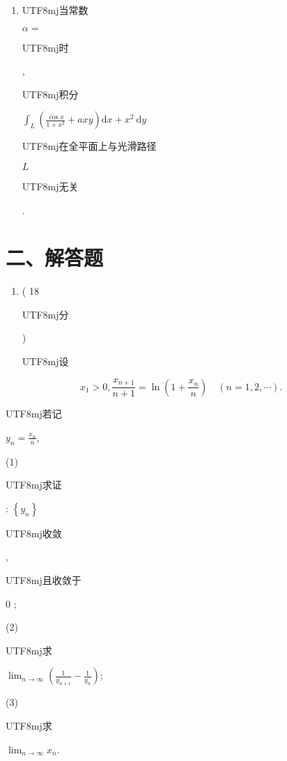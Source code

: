 \documentclass[10pt]{article}
\begin{document}
\begin{enumerate}
  \item \begin{CJK}{UTF8}{mj}当常数\end{CJK} $\alpha=$ \begin{CJK}{UTF8}{mj}时\end{CJK}, \begin{CJK}{UTF8}{mj}积分\end{CJK} $\int_{L}\left(\frac{\cos x}{1+x^{2}}+a x y\right) \mathrm{d} x+x^{2} \mathrm{~d} y$ \begin{CJK}{UTF8}{mj}在全平面上与光滑路径\end{CJK} $L$ \begin{CJK}{UTF8}{mj}无关\end{CJK}.

\end{enumerate}
\section{二、解答题}
\begin{enumerate}
  \item ( 18 \begin{CJK}{UTF8}{mj}分\end{CJK}) \begin{CJK}{UTF8}{mj}设\end{CJK}
\end{enumerate}
$$
x_{1}>0, \frac{x_{n+1}}{n+1}=\ln \left(1+\frac{x_{n}}{n}\right) \quad(n=1,2, \cdots) .
$$
\begin{CJK}{UTF8}{mj}若记\end{CJK} $y_{n}=\frac{x_{n}}{n}$,

(1) \begin{CJK}{UTF8}{mj}求证\end{CJK}: $\left\{y_{n}\right\}$ \begin{CJK}{UTF8}{mj}收敛\end{CJK}, \begin{CJK}{UTF8}{mj}且收敛于\end{CJK} 0 ;

(2) \begin{CJK}{UTF8}{mj}求\end{CJK} $\lim _{n \rightarrow \infty}\left(\frac{1}{y_{n+1}}-\frac{1}{y_{n}}\right)$;

(3) \begin{CJK}{UTF8}{mj}求\end{CJK} $\lim _{n \rightarrow \infty} x_{n}$.
\end{document}

